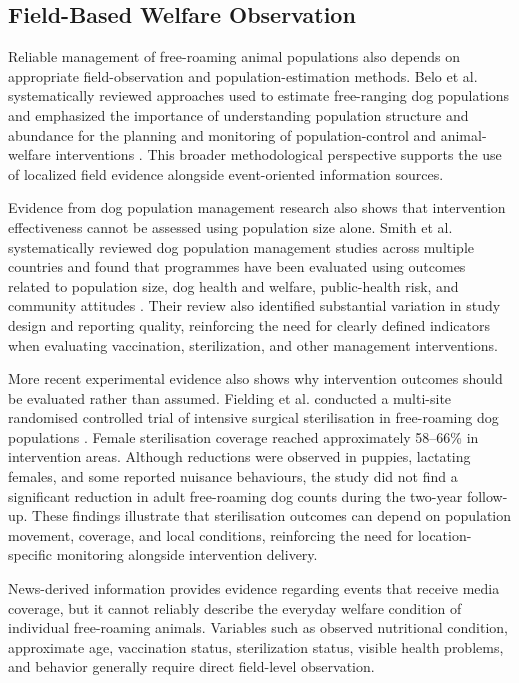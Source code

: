 \documentclass[conference]{IEEEtran}
\begin{document}
\subsection{Field-Based Welfare Observation}

Reliable management of free-roaming animal populations also depends on
appropriate field-observation and population-estimation methods. Belo et al.
systematically reviewed approaches used to estimate free-ranging dog
populations and emphasized the importance of understanding population
structure and abundance for the planning and monitoring of population-control
and animal-welfare interventions \cite{belo2015}. This broader methodological
perspective supports the use of localized field evidence alongside
event-oriented information sources.

Evidence from dog population management research also shows that intervention
effectiveness cannot be assessed using population size alone. Smith et al.
systematically reviewed dog population management studies across multiple
countries and found that programmes have been evaluated using outcomes related
to population size, dog health and welfare, public-health risk, and community
attitudes \cite{smith2019dpm}. Their review also identified substantial
variation in study design and reporting quality, reinforcing the need for
clearly defined indicators when evaluating vaccination, sterilization, and
other management interventions.

More recent experimental evidence also shows why intervention outcomes should
be evaluated rather than assumed. Fielding et al. conducted a multi-site
randomised controlled trial of intensive surgical sterilisation in
free-roaming dog populations \cite{fielding2025sterilisation}. Female
sterilisation coverage reached approximately 58--66\% in intervention areas.
Although reductions were observed in puppies, lactating females, and some
reported nuisance behaviours, the study did not find a significant reduction
in adult free-roaming dog counts during the two-year follow-up. These findings
illustrate that sterilisation outcomes can depend on population movement,
coverage, and local conditions, reinforcing the need for location-specific
monitoring alongside intervention delivery.

News-derived information provides evidence regarding events that receive
media coverage, but it cannot reliably describe the everyday welfare
condition of individual free-roaming animals. Variables such as observed
nutritional condition, approximate age, vaccination status, sterilization
status, visible health problems, and behavior generally require direct
field-level observation.
\end{document}
